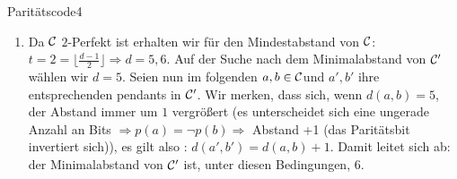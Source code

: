 \begin{aufgabe}{Paritätscode}{4}
\begin{enumerate}[label=\alph*)]
    \item Da \({\cal C}\) \(2\)-Perfekt ist erhalten wir für den Mindestabstand von \({\cal C}\):\\
    \(t = 2 = \lfloor \frac{d-1}{2} \rfloor \Rightarrow d = 5,6\). Auf der Suche nach dem Minimalabstand von \({\cal C}'\) wählen wir \(d = 5\). Seien nun im folgenden \(a,b \in {\cal C}\)und \(a',b'\) ihre entsprechenden pendants in \({\cal C}'\). Wir merken, dass sich, wenn \(d(a,b) = 5\), der Abstand immer um \(1\) vergrößert (es unterscheidet sich eine ungerade Anzahl an Bits \(\Rightarrow p(a) = \neg p(b) \Rightarrow\) Abstand +1 (das Paritätsbit invertiert sich)), es gilt also : \(d(a',b')=d(a,b)+1\). Damit leitet sich ab: der Minimalabstand von \({\cal C}'\) ist, unter diesen Bedingungen, \(6\).
\end{enumerate}
\end{aufgabe}

